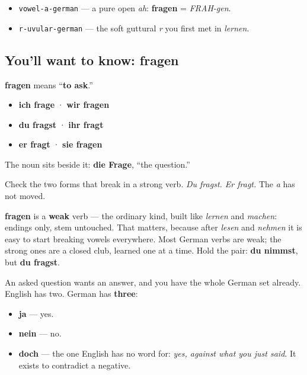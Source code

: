 \begin{sounds}
\begin{itemize}
\raggedright
  \item \texttt{vowel-a-german} — a pure open \emph{ah}: \textbf{fragen} = \emph{FRAH-gen}.
  \item \texttt{r-uvular-german} — the soft guttural \emph{r} you first met in \emph{lernen}.
\end{itemize}
\end{sounds}

\subsection*{You'll want to know: fragen}
\textbf{fragen} means \textquotedblleft{}\textbf{to ask}.\textquotedblright{}

\begin{itemize}
\raggedright
  \item \textbf{ich frage} · \textbf{wir fragen}
  \item \textbf{du fragst} · \textbf{ihr fragt}
  \item \textbf{er fragt} · \textbf{sie fragen}
\end{itemize}

The noun sits beside it: \textbf{die Frage}, \textquotedblleft{}the question.\textquotedblright{}

\begin{grammarlens}[title={Grammar Lens: the vowel that stays}]
Check the two forms that break in a strong verb. \emph{Du fragst. Er fragt.} The \emph{a} has not moved.

\textbf{fragen} is a \textbf{weak} verb — the ordinary kind, built like \emph{lernen} and \emph{machen}: endings only, stem untouched. That matters, because after \emph{lesen} and \emph{nehmen} it is easy to start breaking vowels everywhere. Most German verbs are weak; the strong ones are a closed club, learned one at a time. Hold the pair: \textbf{du nimmst}, but \textbf{du fragst}.
\end{grammarlens}

\begin{culture}
An asked question wants an answer, and you have the whole German set already. English has two. German has \textbf{three}:

\begin{itemize}
\raggedright
  \item \textbf{ja} — yes.
  \item \textbf{nein} — no.
  \item \textbf{doch} — the one English has no word for: \emph{yes, against what you just said}. It exists to contradict a negative.
\end{itemize}
\end{culture}

